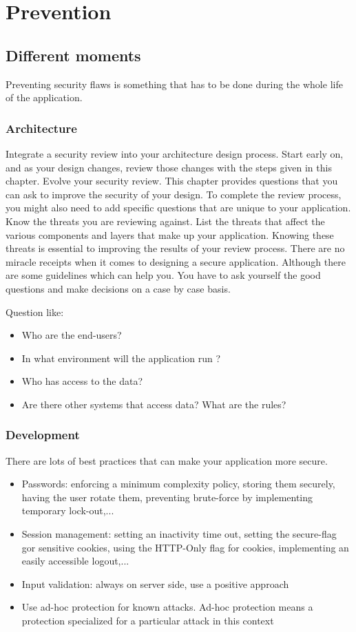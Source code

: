 \section{Prevention}

\subsection{Different moments}
Preventing security flaws is something that has to be done during the
whole life of the application.

\subsubsection{Architecture}
Integrate a security review into your architecture design process. Start
early on, and as your design changes, review those changes with the
steps given in this chapter.
Evolve your security review. This chapter provides questions that you
can ask to improve the security of your design. To complete the review
process, you might also need to add specific questions that are unique
to your application.
Know the threats you are reviewing against. List the threats that affect the various components and layers that make up your application. 
Knowing these threats is essential to improving the results of your review process.
There are no miracle receipts when it comes to designing a secure
application. Although there are some guidelines which can help you. You
have to ask yourself the good questions and make decisions on a case by
case basis.

Question like:
\begin{itemize}
\item Who are the end-users?
\item In what environment will the application run ? 
\item Who has access to the data? 
\item Are there other systems that access data? What are the rules?
\end{itemize}

\subsubsection{Development}
There are lots of best practices that can make your application more secure. 
\begin{itemize}
\item Passwords: enforcing a minimum complexity policy, storing them securely, having the user rotate them, preventing brute-force by implementing temporary lock-out,...
\item Session management: setting an inactivity time out, setting the secure-flag gor sensitive cookies, using the HTTP-Only flag for cookies, implementing an easily accessible logout,...
\item Input validation: always on server side, use a positive approach
\item Use ad-hoc protection for known attacks. Ad-hoc protection means a protection specialized for a particular attack in this context
\end{itemize}

